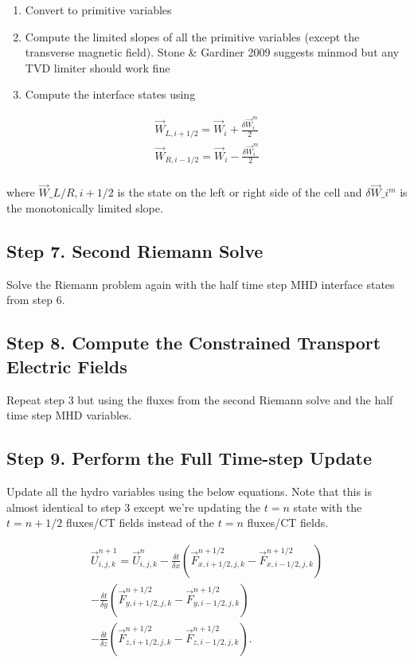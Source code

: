 \begin{enumerate}
    \item Convert to primitive variables
    \item Compute the limited slopes of all the primitive variables (except the transverse magnetic field). Stone \& Gardiner 2009 suggests minmod but any TVD limiter should work fine
    \item Compute the interface states using
\end{enumerate}

    $$
        \begin{aligned}
            \vec{W}_{L, i+1/2} = \vec{W}_{i} + \frac{\delta \vec{W}_{i}^m}{2} \\
            \vec{W}_{R, i-1/2} = \vec{W}_{i} - \frac{\delta \vec{W}_{i}^m}{2} \\
        \end{aligned}
    $$

    where $ \vec{W}\_{L/R, i+1/2} $ is the state on the left or right side
    of the cell and $ \delta \vec{W}\_{i}^m $ is the monotonically limited
    slope.

\subsection{Step 7. Second Riemann Solve}

Solve the Riemann problem again with the half time step MHD interface states from step 6.

\subsection{Step 8. Compute the Constrained Transport Electric Fields}

Repeat step 3 but using the fluxes from the second Riemann solve and the half time step MHD variables.

\subsection{Step 9. Perform the Full Time-step Update}

Update all the hydro variables using the below equations. Note that this is almost identical to step 3 except we're updating the $ t = n $ state with the $ t=n+1/2 $ fluxes/CT fields instead of the $ t=n $ fluxes/CT fields.

$$
    \begin{aligned}
        \vec{U}^{n+1}_{i,j,k} = \vec{U}^{n}_{i,j,k}
        - \frac{\delta t}{\delta x} \left( \vec{F}^{n+1/2}_{x,i+1/2,j,k} - \vec{F}^{n+1/2}_{x,i-1/2,j,k} \right) \\
        - \frac{\delta t}{\delta y} \left( \vec{F}^{n+1/2}_{y,i+1/2,j,k} - \vec{F}^{n+1/2}_{y,i-1/2,j,k} \right) \\
        - \frac{\delta t}{\delta z} \left( \vec{F}^{n+1/2}_{z,i+1/2,j,k} - \vec{F}^{n+1/2}_{z,i-1/2,j,k} \right).
    \end{aligned}
$$

